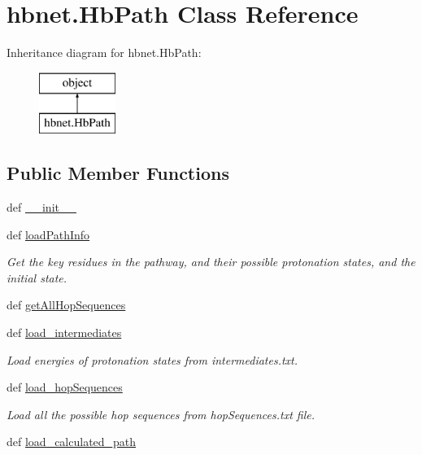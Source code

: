 \hypertarget{classhbnet_1_1_hb_path}{\section{hbnet.\-Hb\-Path Class Reference}
\label{classhbnet_1_1_hb_path}
}
Inheritance diagram for hbnet.\-Hb\-Path\-:\begin{figure}[H]
\begin{center}
\leavevmode
\includegraphics[height=2.000000cm]{classhbnet_1_1_hb_path}
\end{center}
\end{figure}
\subsection*{Public Member Functions}
\begin{DoxyCompactItemize}
\item 
def \hyperlink{classhbnet_1_1_hb_path_accc0aea55bbab3dcff88bc008f9f164e}{\-\_\-\-\_\-init\-\_\-\-\_\-}
\item 
def \hyperlink{classhbnet_1_1_hb_path_a27380bf0f935a0178f5218113f13cc08}{load\-Path\-Info}
\begin{DoxyCompactList}\small\item\em Get the key residues in the pathway, and their possible protonation states, and the initial state. \end{DoxyCompactList}\item 
def \hyperlink{classhbnet_1_1_hb_path_aabee126deca6cdfe0165c7eca0f4f455}{get\-All\-Hop\-Sequences}
\item 
def \hyperlink{classhbnet_1_1_hb_path_aea7db290b896d2e81df966a14d68b6fe}{load\-\_\-intermediates}
\begin{DoxyCompactList}\small\item\em Load energies of protonation states from intermediates.\-txt. \end{DoxyCompactList}\item 
def \hyperlink{classhbnet_1_1_hb_path_a0ee3abc28d0e7c811abd45a8bae85aef}{load\-\_\-hop\-Sequences}
\begin{DoxyCompactList}\small\item\em Load all the possible hop sequences from hop\-Sequences.\-txt file. \end{DoxyCompactList}\item 
def \hyperlink{classhbnet_1_1_hb_path_a15a0c1834be05a45b040f101f6020440}{load\-\_\-calculated\-\_\-path}
\end{DoxyCompactItemize}
